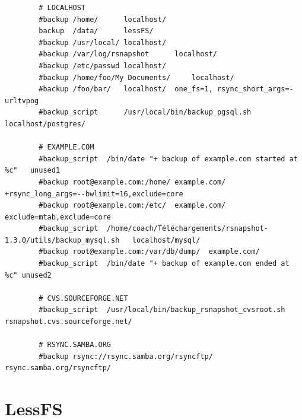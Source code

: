 \documentclass[a4paper]{report}
\begin{document}
\begin{lstlisting}
		# LOCALHOST
		#backup	/home/		localhost/
		backup	/data/		lessFS/
		#backup	/usr/local/	localhost/
		#backup	/var/log/rsnapshot		localhost/
		#backup	/etc/passwd	localhost/
		#backup	/home/foo/My Documents/		localhost/
		#backup	/foo/bar/	localhost/	one_fs=1, rsync_short_args=-urltvpog
		#backup_script		/usr/local/bin/backup_pgsql.sh	localhost/postgres/

		# EXAMPLE.COM
		#backup_script	/bin/date "+ backup of example.com started at %c"	unused1
		#backup	root@example.com:/home/	example.com/	+rsync_long_args=--bwlimit=16,exclude=core
		#backup	root@example.com:/etc/	example.com/	exclude=mtab,exclude=core
		#backup_script	/home/coach/Téléchargements/rsnapshot-1.3.0/utils/backup_mysql.sh	localhost/mysql/
		#backup	root@example.com:/var/db/dump/	example.com/
		#backup_script	/bin/date "+ backup of example.com ended at %c"	unused2

		# CVS.SOURCEFORGE.NET
		#backup_script	/usr/local/bin/backup_rsnapshot_cvsroot.sh	rsnapshot.cvs.sourceforge.net/

		# RSYNC.SAMBA.ORG
		#backup	rsync://rsync.samba.org/rsyncftp/	rsync.samba.org/rsyncftp/
	\end{lstlisting}
\section{LessFS}
\end{document}

